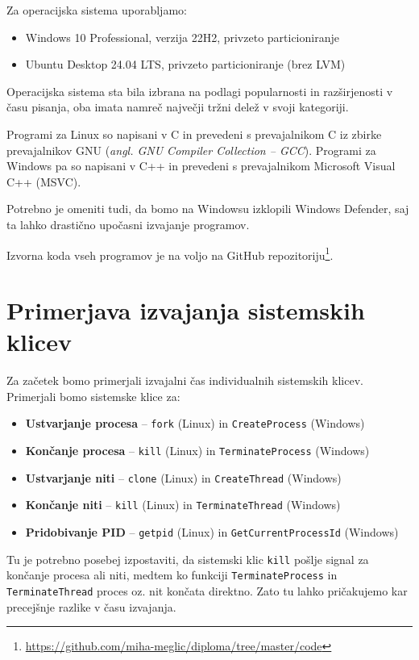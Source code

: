 \documentclass[a4paper,12pt,openright]{book}
\begin{document}
Za operacijska sistema uporabljamo:
\begin{itemize}
	\item Windows 10 Professional, verzija 22H2, privzeto particioniranje
	\item Ubuntu Desktop 24.04 LTS, privzeto particioniranje (brez LVM)
\end{itemize}
Operacijska sistema sta bila izbrana na podlagi popularnosti in razširjenosti v času pisanja, oba imata namreč največji tržni delež v svoji kategoriji.

Programi za Linux so napisani v C in prevedeni s prevajalnikom C iz zbirke prevajalnikov GNU (\textit{angl. GNU Compiler Collection -- GCC}).
Programi za Windows pa so napisani v C++ in prevedeni s prevajalnikom Microsoft Visual C++ (MSVC).

Potrebno je omeniti tudi, da bomo na Windowsu izklopili Windows Defender, saj ta lahko drastično upočasni izvajanje programov.

Izvorna koda vseh programov je na voljo na GitHub repozitoriju\footnote{\url{https://github.com/miha-meglic/diploma/tree/master/code}}.

\section{Primerjava izvajanja sistemskih klicev}

Za začetek bomo primerjali izvajalni čas individualnih sistemskih klicev.
Primerjali bomo sistemske klice za:
\begin{itemize}
	\item \textbf{Ustvarjanje procesa} -- \texttt{fork} (Linux) in \texttt{CreateProcess} (Windows)
	\item \textbf{Končanje procesa} -- \texttt{kill} (Linux) in \texttt{TerminateProcess} (Windows)
	\item \textbf{Ustvarjanje niti} -- \texttt{clone} (Linux) in \texttt{CreateThread} (Windows)
	\item \textbf{Končanje niti} -- \texttt{kill} (Linux) in \texttt{TerminateThread} (Windows)
	\item \textbf{Pridobivanje PID} -- \texttt{getpid} (Linux) in \texttt{GetCurrentProcessId} (Windows)
\end{itemize}

Tu je potrebno posebej izpostaviti, da sistemski klic \texttt{kill} pošlje signal za končanje procesa ali niti, medtem ko funkciji \texttt{TerminateProcess} in \texttt{Terminate\-Thread} proces oz. nit končata direktno.
Zato tu lahko pričakujemo kar precejšnje razlike v času izvajanja.
\end{document}
